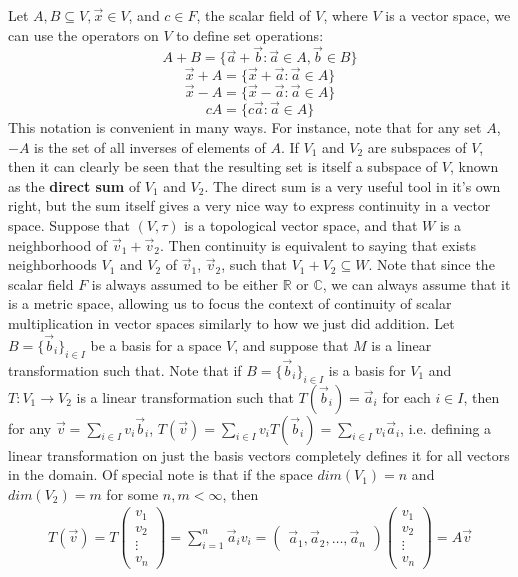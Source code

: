 \documentclass{article}
\theoremstyle{definition}
\theoremstyle{plain}
\theoremstyle{theorem}
\begin{document}
Let $A,B \subseteq V, \vec{x} \in V$, and $c \in F$, the scalar field of $V$, where $V$ is a vector space, we can use the operators on $V$ to define set operations:
\[ A+B = \{\vec{a}+\vec{b}: \vec{a} \in A, \vec{b} \in B \} \]
\[ \vec{x}+A = \{ \vec{x}+\vec{a}: \vec{a} \in A \} \]
\[ \vec{x}-A = \{ \vec{x}-\vec{a}: \vec{a} \in A \}  \]
\[ cA = \{c\vec{a}: \vec{a} \in A\} \]
This notation is convenient in many ways. For instance, note that for any set $A$, $-A$ is the set of all inverses of elements of $A$. 
If $V_1$ and $V_2$ are subspaces of $V$, then it can clearly be seen that the resulting set is itself a subspace of $V$, known as the \textbf{direct sum} of $V_1$ and $V_2$. The direct sum is a very useful tool in it's own right, but the sum itself gives a very nice way to express continuity in a vector space. Suppose that $(V,\tau)$ is a topological vector space, and that $W$ is a neighborhood of $\vec{v}_1+\vec{v}_2$. Then continuity is equivalent to saying that exists neighborhoods $V_1$ and $V_2$ of $\vec{v}_1$, $\vec{v}_2$, such that $V_1+V_2 \subseteq W$. Note that since the scalar field $F$ is always assumed to be either $\mathbb{R}$ or $\mathbb{C}$, we can always assume that it is a metric space, allowing us to focus the context of continuity of scalar multiplication in vector spaces similarly to how we just did addition. 
Let $B = \{\vec{b}_i\}_{i \in I}$ be a basis for a space $V$, and suppose that $M$ is a linear transformation such that. Note that if $B = \{\vec{b}_i\}_{i \in I}$ is a basis for $V_1$ and $T:V_1 \to V_2$ is a linear transformation such that $T(\vec{b}_i) = \vec{a}_i$ for each $i\in I$, then for any $\vec{v} = \sum_{i \in I} v_i\vec{b}_i$, $T(\vec{v}) = \sum_{i \in I} v_iT(\vec{b}_i) = \sum_{i \in I} v_i \vec{a}_i$, i.e. defining a linear transformation on just the basis vectors completely defines it for all vectors in the domain. Of special note is that if the space $dim(V_1) = n$ and $dim(V_2) = m$ for some $n,m < \infty$, then 
\begin{align}
	T(\vec{v}) = T\begin{pmatrix} v_1 \\ v_2 \\ \vdots \\ v_n \end{pmatrix} = \sum_{i=1}^n \vec{a}_i v_i = \begin{pmatrix} \vec{a}_1, \vec{a}_2, \ldots, \vec{a}_n \end{pmatrix} \begin{pmatrix} v_1 \\ v_2 \\ \vdots \\ v_n \end{pmatrix} = A\vec{v}
\end{align}
\end{document}
